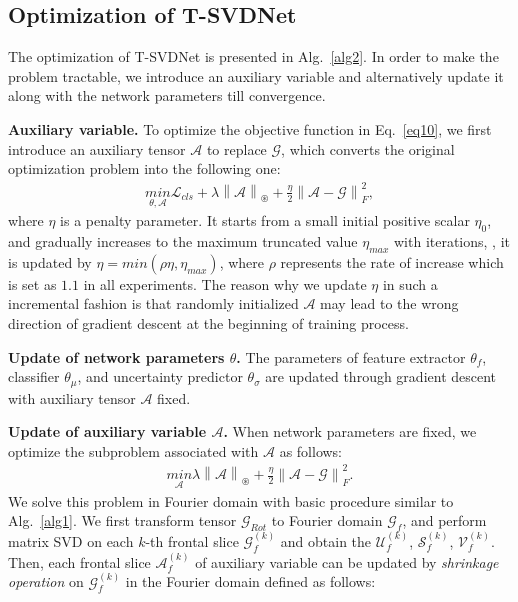 \documentclass[10pt,twocolumn,letterpaper]{article}
\begin{document}
\subsection{Optimization of T-SVDNet}
\label{sec3.5}
The optimization of T-SVDNet is presented in Alg.~\ref{alg2}. In order to make the problem tractable, we introduce an auxiliary variable and alternatively update it along with the network parameters till convergence.\par
\textbf{Auxiliary variable.} To optimize the objective function in Eq.~\ref{eq10}, we first introduce an auxiliary tensor $\mathcal{A}$ to replace $\mathcal{G}$, which converts the original optimization problem into the following one:  
\begin{align}
	\underset{\theta, \mathcal{A}}{min}\mathcal{L}_{cls}+\lambda\left \| \mathcal{A} \right \|_\circledast+\frac{\eta}{2}\left \| \mathcal{A-G} \right \|_F^2,
\end{align}
where $\eta$ is a penalty parameter. It starts from a small initial positive scalar $\eta_0$, and gradually increases to the maximum truncated value $\eta_{max}$ with iterations, \ie, it is updated by $\eta = min(\rho\eta, \eta_{max})$, where $\rho$ represents the rate of increase which is set as $1.1$ in all experiments. The reason why we update $\eta$ in such a incremental fashion is that randomly initialized $\mathcal{A}$ may lead to the wrong direction of gradient descent at the beginning of training process.  \par 
\textbf{Update of network parameters $\theta$.} The parameters of feature extractor $\theta_f$, classifier $\theta_{\mu}$, and uncertainty predictor $\theta_{\sigma}$ are updated through gradient descent with auxiliary tensor $\mathcal{A}$ fixed. \par
\textbf{Update of auxiliary variable $\mathcal{A}$.} When network parameters are fixed, we optimize the subproblem associated with $\mathcal{A}$ as follows:
\begin{align}
	\underset{\mathcal{A}}{min}\lambda\left \| \mathcal{A} \right \|_\circledast+\frac{\eta}{2}\left \| \mathcal{A}-\mathcal{G} \right \|_{F}^{2}.
\end{align}  
We solve this problem in Fourier domain with basic procedure similar to Alg.~\ref{alg1}. We first transform tensor $\mathcal{G}_{Rot}$ to Fourier domain $\mathcal{G}_f$, and perform matrix SVD on each $k$-th frontal slice $\mathcal{G}_f^{(k)}$ and obtain the $\mathcal{U}_f^{(k)}$, $\mathcal{S}_f^{(k)}$, $\mathcal{V}_f^{(k)}$. Then, each frontal slice $\mathcal{A}_f^{(k)}$ of auxiliary variable can be updated by \textit{shrinkage operation} \cite{cai2010a,kolda2009tensor} on $\mathcal{G}_f^{(k)}$ in the Fourier domain defined as follows:  
\end{document}
